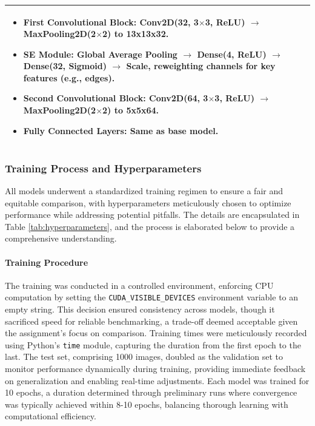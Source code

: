 \documentclass[12pt]{article}
\begin{document}
\begin{table}[H]
\begin{tabularx}{\textwidth}{l X}
\begin{itemize}
            \item \textbf{First Convolutional Block}: Conv2D(32, 3$\times$3, ReLU) $\rightarrow$ MaxPooling2D(2$\times$2) to 13x13x32.
            \item \textbf{SE Module}: Global Average Pooling $\rightarrow$ Dense(4, ReLU) $\rightarrow$ Dense(32, Sigmoid) $\rightarrow$ Scale, reweighting channels for key features (e.g., edges).
            \item \textbf{Second Convolutional Block}: Conv2D(64, 3$\times$3, ReLU) $\rightarrow$ MaxPooling2D(2$\times$2) to 5x5x64.
            \item \textbf{Fully Connected Layers}: Same as base model.
        \end{itemize} \\
        \bottomrule
    \end{tabularx}
\end{table}

\subsubsection{Training Process and Hyperparameters}
All models underwent a standardized training regimen to ensure a fair and equitable comparison, with hyperparameters meticulously chosen to optimize performance while addressing potential pitfalls. The details are encapsulated in Table \ref{tab:hyperparameters}, and the process is elaborated below to provide a comprehensive understanding.

\paragraph{Training Procedure}
The training was conducted in a controlled environment, enforcing CPU computation by setting the \texttt{CUDA\_VISIBLE\_DEVICES} environment variable to an empty string. This decision ensured consistency across models, though it sacrificed speed for reliable benchmarking, a trade-off deemed acceptable given the assignment's focus on comparison. Training times were meticulously recorded using Python's \texttt{time} module, capturing the duration from the first epoch to the last. The test set, comprising 1000 images, doubled as the validation set to monitor performance dynamically during training, providing immediate feedback on generalization and enabling real-time adjustments. Each model was trained for 10 epochs, a duration determined through preliminary runs where convergence was typically achieved within 8-10 epochs, balancing thorough learning with computational efficiency.
\end{document}
